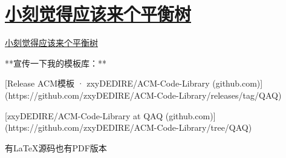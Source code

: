 \documentclass[12pt, a4paper, oneside]{ctexart}
\begin{document}
\newpage 
\section{\href{https://ac.nowcoder.com/acm/contest/72386/H}{小刻觉得应该来个平衡树}} 
\href{https://ac.nowcoder.com/acm/contest/72386/H}{小刻觉得应该来个平衡树}
\hspace*{\fill} \par
**宣传一下我的模板库：** 

[Release ACM模板 · zxyDEDIRE/ACM-Code-Library (github.com)](https://github.com/zxyDEDIRE/ACM-Code-Library/releases/tag/QAQ)

[zxyDEDIRE/ACM-Code-Library at QAQ (github.com)](https://github.com/zxyDEDIRE/ACM-Code-Library/tree/QAQ)

有LaTeX源码也有PDF版本
\begin{lstlisting}
\end{lstlisting}
\end{document}
